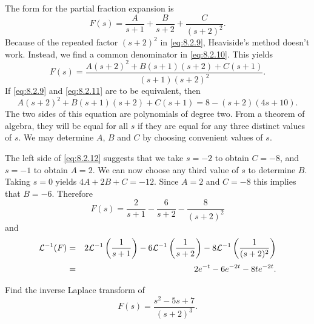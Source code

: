 \begin{examplesolution}
\solution The form for the partial fraction expansion is
\begin{equation}
  \label{eq:8.2.10}F(s)=\frac{A}{s+1}+\frac{B}{s+2}+\frac{C}{(s+2)^{2}}.
\end{equation}
Because of the repeated factor $(s+2)^{2}$ in \eqref{eq:8.2.9}, Heaviside's method doesn't work.
Instead, we find a common denominator in \eqref{eq:8.2.10}. This yields
\begin{equation}
  \label{eq:8.2.11}F(s)=\frac{A(s+2)^{2}+B(s+1)(s+2)+C(s+1)}{(s+1)(s+2)^{2}}.
\end{equation}
If \eqref{eq:8.2.9} and \eqref{eq:8.2.11} are to be equivalent, then
\begin{equation}
  \label{eq:8.2.12}A(s+2)^{2}+B(s+1)(s+2)+C(s+1)=8-(s+2)(4s+10).
\end{equation}
The two sides of this equation are polynomials of degree two. From a theorem of algebra, they will
be equal for all $s$ if they are equal for any three distinct values of $s$. We may determine $A$,
$B$ and $C$ by choosing convenient values of $s$.

The left side of \eqref{eq:8.2.12} suggests that we take $s=-2$ to obtain $C=-8$, and $s=-1$ to
obtain $A=2$. We can now choose any third value of $s$ to determine $B$. Taking $s=0$ yields
$4A+2B+C=-12$. Since $A=2$ and $C=-8$ this implies that $B=-6$. Therefore
\[
  F(s)=\frac{2}{s+1}-\frac{6}{s+2}-\frac{8}{(s+2)^{2}}
\]
and
\begin{eqnarray*}
  {\cal L}^{-1}(F) & = & 2{\cal L}^{-1}\left(\frac{1}{s+1}\right)-6{\cal L}^{-1}\left(\frac{1}{s+2}\right)-8{\cal L}^{-1}\left(\frac{1}{(s+2)^{2}}\right) \\[1\jot]
                   & = & 2e^{-t}-6e^{-2t}-8te^{-2t}.
\end{eqnarray*}
\end{examplesolution}

\begin{example}
  \label{example:8.2.7}\rm Find the inverse Laplace transform of
  \[
    F(s)=\frac{s^{2}-5s+7}{(s+2)^{3}}.
  \]
\end{example}

